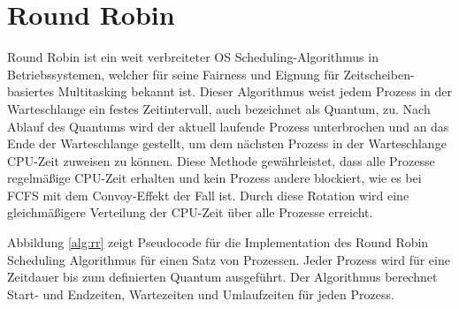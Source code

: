 
\section{Round Robin}
Round Robin ist ein weit verbreiteter OS Scheduling-Algorithmus in Betriebssystemen, welcher für seine Fairness und Eignung für Zeitscheiben-basiertes Multitasking bekannt ist. Dieser Algorithmus weist jedem Prozess in der Warteschlange ein festes Zeitintervall, auch bezeichnet als Quantum, zu. Nach Ablauf des Quantums wird der aktuell laufende Prozess unterbrochen und an das Ende der Warteschlange gestellt, um dem nächsten Prozess in der Warteschlange \ac{CPU}-Zeit zuweisen zu können. Diese Methode gewährleistet, dass alle Prozesse regelmäßige \ac{CPU}-Zeit erhalten und kein Prozess andere blockiert, wie es bei \ac{FCFS} mit dem Convoy-Effekt der Fall ist. Durch diese Rotation wird eine gleichmäßigere Verteilung der \ac{CPU}-Zeit über alle Prozesse erreicht. %


Abbildung \ref{alg:rr} zeigt Pseudocode für die Implementation des Round Robin Scheduling Algorithmus für einen Satz von Prozessen. Jeder Prozess wird für eine Zeitdauer bis zum definierten Quantum ausgeführt. Der Algorithmus berechnet Start- und Endzeiten, Wartezeiten und Umlaufzeiten für jeden Prozess. 

